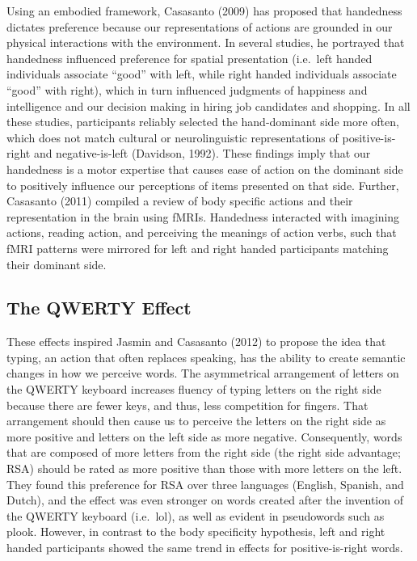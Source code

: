 \documentclass[english,man]{apa6}
\theoremstyle{definition}
\theoremstyle{definition}
\theoremstyle{definition}
\theoremstyle{remark}
\begin{document}
Using an embodied framework, Casasanto (2009) has proposed that
handedness dictates preference because our representations of actions
are grounded in our physical interactions with the environment. In
several studies, he portrayed that handedness influenced preference for
spatial presentation (i.e.~left handed individuals associate
\enquote{good} with left, while right handed individuals associate
\enquote{good} with right), which in turn influenced judgments of
happiness and intelligence and our decision making in hiring job
candidates and shopping. In all these studies, participants reliably
selected the hand-dominant side more often, which does not match
cultural or neurolinguistic representations of positive-is-right and
negative-is-left (Davidson, 1992). These findings imply that our
handedness is a motor expertise that causes ease of action on the
dominant side to positively influence our perceptions of items presented
on that side. Further, Casasanto (2011) compiled a review of body
specific actions and their representation in the brain using fMRIs.
Handedness interacted with imagining actions, reading action, and
perceiving the meanings of action verbs, such that fMRI patterns were
mirrored for left and right handed participants matching their dominant
side.

\subsection{The QWERTY Effect}\label{the-qwerty-effect}

These effects inspired Jasmin and Casasanto (2012) to propose the idea
that typing, an action that often replaces speaking, has the ability to
create semantic changes in how we perceive words. The asymmetrical
arrangement of letters on the QWERTY keyboard increases fluency of
typing letters on the right side because there are fewer keys, and thus,
less competition for fingers. That arrangement should then cause us to
perceive the letters on the right side as more positive and letters on
the left side as more negative. Consequently, words that are composed of
more letters from the right side (the right side advantage; RSA) should
be rated as more positive than those with more letters on the left. They
found this preference for RSA over three languages (English, Spanish,
and Dutch), and the effect was even stronger on words created after the
invention of the QWERTY keyboard (i.e.~lol), as well as evident in
pseudowords such as plook. However, in contrast to the body specificity
hypothesis, left and right handed participants showed the same trend in
effects for positive-is-right words.
\end{document}
